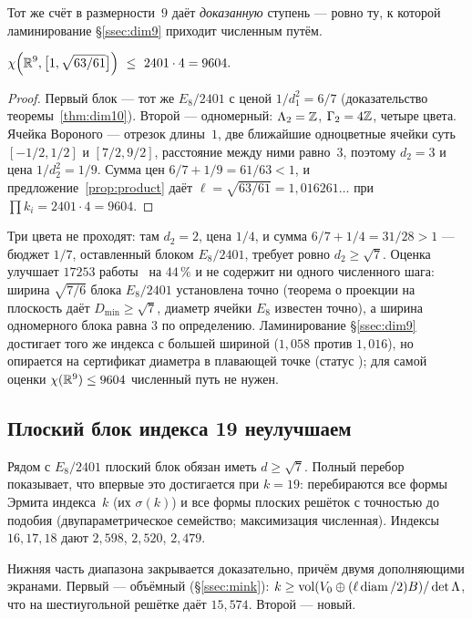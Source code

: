 Тот же счёт в размерности~$9$ даёт \emph{доказанную} ступень --- ровно ту, к
которой ламинирование \S\ref{ssec:dim9} приходит численным путём.

\begin{corollary}\label{cor:dim9}
$\displaystyle\chi\Bigl(\R^9,\bigl[1,\sqrt{63/61}\bigr]\Bigr)\ \le\ 2401\cdot4=9604.$
\end{corollary}

\begin{proof}
Первый блок --- тот же $E_8/2401$ с ценой $1/d_1^2=6/7$ (доказательство
теоремы~\ref{thm:dim10}). Второй --- одномерный: $\Lambda_2=\mathbb{Z}$,
$\Gamma_2=4\mathbb{Z}$, четыре цвета. Ячейка Вороного --- отрезок длины~$1$, две
ближайшие одноцветные ячейки суть $[-1/2,1/2]$ и $[7/2,9/2]$, расстояние
между ними равно~$3$, поэтому $d_2=3$ и цена $1/d_2^2=1/9$. Сумма цен
$6/7+1/9=61/63<1$, и предложение~\ref{prop:product} даёт
$\ell=\sqrt{63/61}=1{,}016261\ldots$ при $\prod k_i=2401\cdot4=9604$.
\end{proof}

Три цвета не проходят: там $d_2=2$, цена $1/4$, и сумма $6/7+1/4=31/28>1$ ---
бюджет $1/7$, оставленный блоком $E_8/2401$, требует ровно $d_2\ge\sqrt7$.
Оценка улучшает $17253$ работы~\cite{ABPR} на $44\,\%$ и не содержит ни одного
численного шага: ширина $\sqrt{7/6}$ блока $E_8/2401$ установлена точно
(теорема о проекции на плоскость даёт $D_{\min}\ge\sqrt7$, диаметр ячейки $E_8$ известен
точно), а ширина одномерного блока равна $3$ по определению. Ламинирование
\S\ref{ssec:dim9} достигает того же индекса с большей шириной ($1{,}058$
против $1{,}016$), но опирается на сертификат диаметра в плавающей точке
(статус \stN); для самой оценки $\chi(\mathbb{R}^9)\le9604$ численный путь не нужен.

\subsection{Плоский блок индекса 19 неулучшаем}
\label{ssec:planefloor}

Рядом с $E_8/2401$ плоский блок обязан иметь $d\ge\sqrt7$. Полный перебор
показывает, что впервые это достигается при $k=19$: перебираются все формы
Эрмита индекса~$k$ (их $\sigma(k)$) и все формы плоских решёток с точностью до
подобия (двупараметрическое семейство; максимизация численная). Индексы
$16,17,18$ дают $2{,}598$, $2{,}520$, $2{,}479$.

Нижняя часть диапазона закрывается доказательно, причём двумя дополняющими
экранами. Первый --- объёмный (\S\ref{ssec:mink}): $k\ge\operatorname{vol}(V_0\oplus
(\ell\operatorname{diam}/2)B)/\det\Lambda$, что на шестиугольной решётке даёт $15{,}574$.
Второй --- новый.

